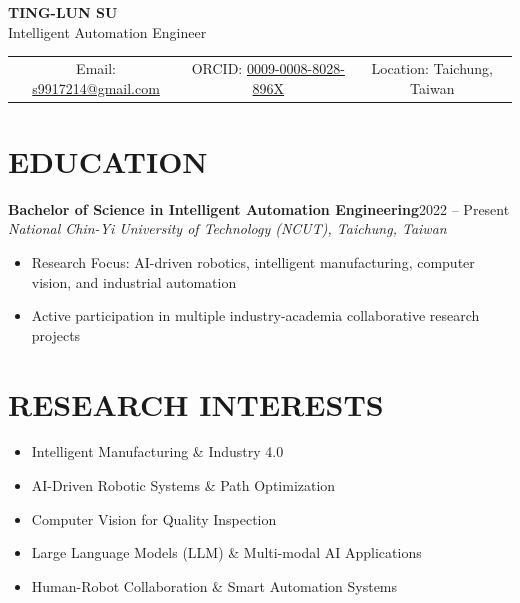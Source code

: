 \documentclass[11pt,a4paper]{article}
\newcommand{\cventry}[4]{
    \noindent\textbf{#1}\hfill#2\\
    \textit{#3}\\
    #4
    \vspace{0.3cm}
}
\begin{document}
\begin{center}
    {\Huge\textbf{TING-LUN SU}}\\[0.3cm]
    {\large Intelligent Automation Engineer}\\[0.5cm]

    \begin{tabular}{c c c}
        Email: \href{mailto:s9917214@gmail.com}{s9917214@gmail.com} &
        ORCID: \href{https://orcid.org/0009-0008-8028-896X}{0009-0008-8028-896X} &
        Location: Taichung, Taiwan
    \end{tabular}
\end{center}

\vspace{0.5cm}

\section*{EDUCATION}

\cventry{Bachelor of Science in Intelligent Automation Engineering}{2022 -- Present}
{National Chin-Yi University of Technology (NCUT), Taichung, Taiwan}
{
    \begin{itemize}[leftmargin=*, itemsep=0pt]
        \item Research Focus: AI-driven robotics, intelligent manufacturing, computer vision, and industrial automation
        \item Active participation in multiple industry-academia collaborative research projects
    \end{itemize}
}

\section*{RESEARCH INTERESTS}

\begin{itemize}[leftmargin=*, itemsep=2pt]
    \item Intelligent Manufacturing \& Industry 4.0
    \item AI-Driven Robotic Systems \& Path Optimization
    \item Computer Vision for Quality Inspection
    \item Large Language Models (LLM) \& Multi-modal AI Applications
    \item Human-Robot Collaboration \& Smart Automation Systems
\end{itemize}
\end{document}
